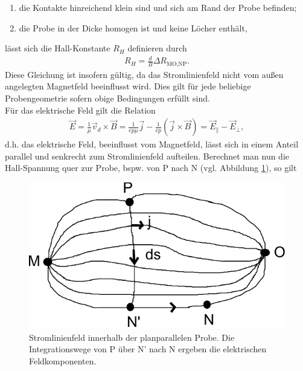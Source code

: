 \documentclass[a4paper,12pt]{article}
\begin{document}
\begin{enumerate}
\item die Kontakte hinreichend klein sind und sich am Rand der Probe befinden;
\item die Probe in der Dicke homogen ist und keine Löcher enthält,
\end{enumerate}
lässt sich die Hall-Konstante $R_H$ definieren durch
\begin{align}
R_H=\frac{d}{B}\Delta R_\text{MO,NP}.
\end{align}
Diese Gleichung ist insofern gültig, da das Stromlinienfeld nicht vom außen angelegten Magnetfeld beeinflusst wird. Dies gilt für jede beliebige Probengeometrie sofern obige Bedingungen erfüllt sind.\\
Für das elektrische Feld gilt die Relation
\begin{align}
\vec{E}=\frac{1}{\mu}\vec{v}_d\times \vec{B}=\frac{1}{ep\mu}\vec{j}-\frac{1}{ep}(\vec{j}\times \vec{B})=\vec{E}_{\parallel}-\vec{E}_{\perp},
\end{align}
d.h. das elektrische Feld, beeinflusst vom Magnetfeld, lässt sich in einem Anteil parallel und senkrecht zum Stromlinienfeld aufteilen. Berechnet man nun die Hall-Spannung quer zur Probe, bspw. von P nach N (vgl. Abbildung \ref{fig:current_field}), so gilt
\begin{figure}[h]
\centering
\includegraphics[scale=1]{current_field.pdf}
\caption{Stromlinienfeld innerhalb der planparallelen Probe. Die Integrationswege von P über N' nach N ergeben die elektrischen Feldkomponenten.}
\label{fig:current_field}
\end{figure}
\end{document}
